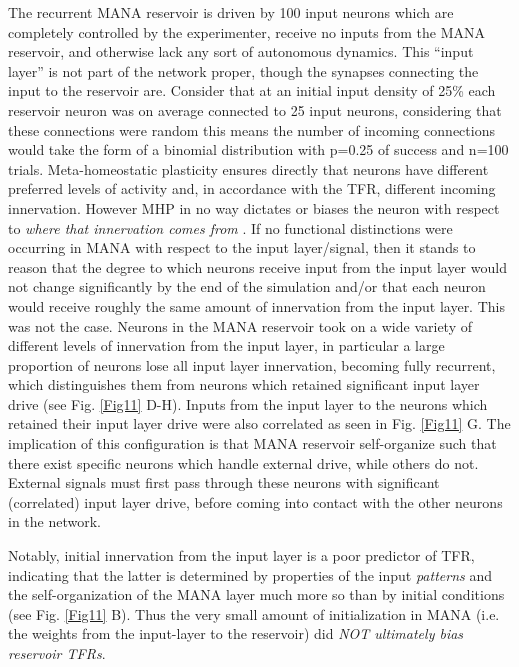 \documentclass[10pt,letterpaper]{article}
\begin{document}
The recurrent MANA reservoir is driven by 100 input neurons which are completely controlled by the experimenter, receive no inputs from the MANA reservoir, and otherwise lack any sort of autonomous dynamics. This ``input layer'' is not part of the network proper, though the synapses connecting the input to the reservoir are. Consider that at an initial input density of 25\% each reservoir neuron was on average connected to 25 input neurons, considering that these connections were random this means the number of incoming connections would take the form of a binomial distribution with p=0.25 of success and n=100 trials. Meta-homeostatic plasticity ensures directly that neurons have different preferred levels of activity and, in accordance with the TFR, different incoming innervation. However MHP in no way dictates or biases the neuron with respect to \emph{where that innervation comes from} . If no functional distinctions were occurring in MANA with respect to the input layer/signal, then it stands to reason that the degree to which neurons receive input from the input layer would not change significantly by the end of the simulation and/or that each neuron would receive roughly the same amount of innervation from the input layer. This was not the case. Neurons in the MANA reservoir took on a wide variety of different levels of innervation from the input layer, in particular a large proportion of neurons lose all input layer innervation, becoming fully recurrent, which distinguishes them from neurons which retained significant input layer drive (see Fig. \ref{Fig11} D-H). Inputs from the input layer to the neurons which retained their input layer drive were also correlated as seen in Fig. \ref{Fig11} G. The implication of this configuration is that MANA reservoir self-organize such that there exist specific neurons which handle external drive, while others do not. External signals must first pass through these neurons with significant (correlated) input layer drive, before coming into contact with the other neurons in the network. 

Notably, initial innervation from the input layer is a poor predictor of TFR, indicating that the latter is determined by properties of the input \emph{patterns} and the self-organization of the MANA layer much more so than by initial conditions (see Fig. \ref{Fig11} B). Thus the very small amount of initialization in MANA (i.e. the weights from the input-layer to the reservoir) did \emph{NOT ultimately bias reservoir TFRs}. 
\end{document}
